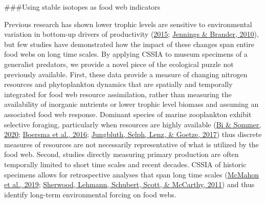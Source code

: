 \documentclass [11pt, proquest] {uwthesis}[2015/03/03]
\begin{document}
\#\#\#Using stable isotopes as food web indicators

Previous research has shown lower trophic levels are sensitive to environmental variation in bottom-up drivers of productivity (\protect\hyperlink{ref-Frank2015}{2015}; \protect\hyperlink{ref-Jennings2010}{Jennings \& Brander, 2010}), but few studies have demonstrated how the impact of these changes span entire food webs on long time scales. By applying CSSIA to museum specimens of a generalist predators, we provide a novel piece of the ecological puzzle not previously available. First, these data provide a measure of changing nitrogen resources and phytoplankton dynamics that are spatially and temporally integrated for food web resource assimilation, rather than measuring the availability of inorganic nutrients or lower trophic level biomass and assuming an associated food web response. Dominant species of marine zooplankton exhibit selective foraging, particularly when resources are highly available (\protect\hyperlink{ref-Bi2020}{Bi \& Sommer, 2020}; \protect\hyperlink{ref-Boersma2015}{Boersma et al., 2016}; \protect\hyperlink{ref-Jungbluth2017}{Jungbluth, Selph, Lenz, \& Goetze, 2017}) thus discrete measures of resources are not necessarily representative of what is utilized by the food web. Second, studies directly measuring primary production are often temporally limited to short time scales and recent decades. CSSIA of historic specimens allows for retrospective analyses that span long time scales (\protect\hyperlink{ref-McMahon2019}{McMahon et al., 2019}; \protect\hyperlink{ref-Sherwood2011}{Sherwood, Lehmann, Schubert, Scott, \& McCarthy, 2011}) and thus identify long-term environmental forcing on food webs.
\end{document}
